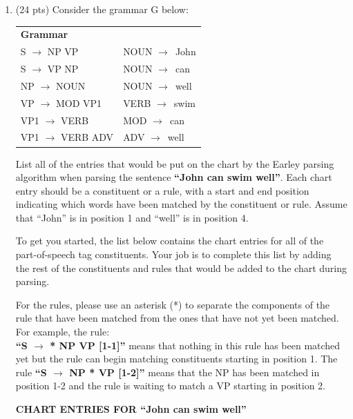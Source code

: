 \documentclass[11pt]{article}
\newcommand{\ra}{$\rightarrow$~}
\begin{document}
\begin{enumerate}
\item (24 pts) Consider the grammar G below:

\begin{center}
\begin{tabular}{|ll|} \hline
\textbf{Grammar} & ~ \\  
S $\rightarrow$ NP VP    & NOUN \ra John \\
S $\rightarrow$ VP NP    & NOUN \ra can \\
NP $\rightarrow$ NOUN    & NOUN \ra well \\
VP $\rightarrow$ MOD VP1 & VERB \ra swim \\
VP1 $\rightarrow$ VERB   & MOD \ra can \\
VP1 $\rightarrow$ VERB ADV & ADV \ra well \\  \hline
\end{tabular}
\end{center}

List all of the entries that would be put on the chart by the Earley
parsing algorithm when parsing the sentence {\bf ``John can swim
  well''}.  Each chart entry should be a constituent or a rule, with a
start and end position indicating which words have been matched by the
constituent or rule. Assume that ``John'' is in position 1 and
``well'' is in position 4.

To get you started, the list below contains the chart entries for all
of the part-of-speech tag constituents. Your job is to complete
this list by adding the rest of the constituents and rules that would
be added to the chart during parsing.

For the rules, please use an asterisk (*) to separate the components
of the rule that have been matched from the ones that have not yet
been matched. For example, the rule: \\ {\bf ``S $\rightarrow$ * NP VP
  [1-1]''} means that nothing in this rule has been matched yet but
the rule can begin matching constituents starting in position 1.  The
rule {\bf ``S $\rightarrow$ NP * VP [1-2]''} means that the NP has
been matched in position 1-2 and the rule is waiting to match a VP
starting in position 2.

\begin{center}
{\bf CHART ENTRIES FOR ``John can swim well''} 


\end{center}
\end{enumerate}
\end{document}
